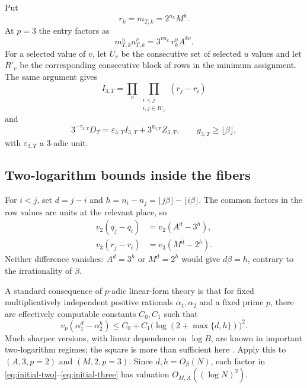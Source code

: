 \documentclass[11pt,oneside]{article}
\theoremstyle{definition}
\theoremstyle{remark}
\begin{document}
Put
\begin{equation}\label{eq:three-unit-input}
 r_k=m_{T,k}=2^{n_k}M^k.
\end{equation}
At $p=3$ the entry factors as
\[
 m_{T,k}^ua_{T,k}^v
 =3^{vn_k}\,r_k^uA^{kv}.
\]
For a selected value of $v$, let $U_v$ be the consecutive set of selected $u$ values and let
$R'_v$ be the corresponding consecutive block of rows in the minimum assignment.  The same
argument gives
\begin{equation}\label{eq:initial-three}
 I_{3,T}
 =\prod_v\prod_{\substack{i<j\\i,j\in R'_v}}(r_j-r_i)
\end{equation}
and
\begin{equation}\label{eq:three-layer-expansion}
 3^{-\tau_{3,T}}D_T
 =\varepsilon_{3,T}I_{3,T}+3^{g_{3,T}}Z_{3,T},
 \qquad g_{3,T}\ge\lfloor\beta\rfloor,
\end{equation}
with $\varepsilon_{3,T}$ a $3$-adic unit.

\subsection{Two-logarithm bounds inside the fibers}

For $i<j$, set $d=j-i$ and
$h=n_i-n_j=\lfloor j\beta\rfloor-\lfloor i\beta\rfloor$.  The common factors in the row
values are units at the relevant place, so
\begin{align}
 v_2(q_j-q_i)&=v_2(A^d-3^h), \label{eq:qdiff-two}\\
 v_3(r_j-r_i)&=v_3(M^d-2^h). \label{eq:rdiff-three}
\end{align}
Neither difference vanishes: $A^d=3^h$ or $M^d=2^h$ would give $d\beta=h$, contrary to the
irrationality of $\beta$.

A standard consequence of $p$-adic linear-form theory is that for fixed multiplicatively
independent positive rationals $\alpha_1,\alpha_2$ and a fixed prime $p$, there are effectively
computable constants $C_0,C_1$ such that
\begin{equation}\label{eq:padic-two-log}
 v_p(\alpha_1^d-\alpha_2^h)
 \le C_0+C_1\bigl(\log(2+\max\{d,h\})\bigr)^2.
\end{equation}
Much sharper versions, with linear dependence on $\log B$, are known in important two-logarithm
regimes; the square is more than sufficient here
\cite{BugeaudLaurent1996,Bugeaud2002,Yu1998}.  Apply this to $(A,3,p=2)$ and
$(M,2,p=3)$.  Since $d,h=O_\beta(N)$, each factor in
\eqref{eq:initial-two}--\eqref{eq:initial-three} has valuation
$O_{M,A}((\log N)^2)$.
\end{document}
